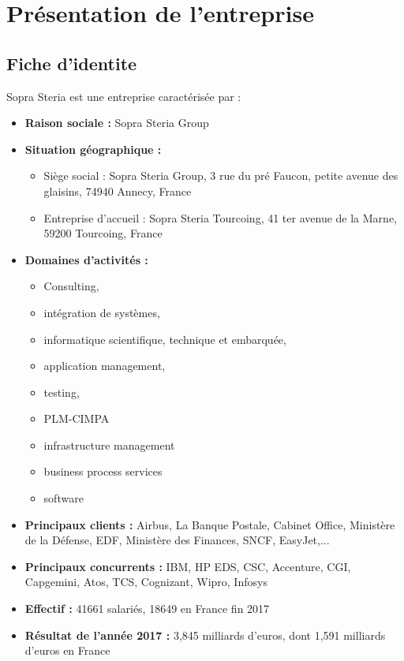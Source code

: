\section{Présentation de l'entreprise}

\subsection{Fiche d'identite}
Sopra Steria est une entreprise caractérisée par :\newline
\begin{itemize}
	\item \textbf{Raison sociale :} Sopra Steria Group
\item  \textbf{Situation géographique :} 
\begin{itemize}
\item Siège social : Sopra Steria Group, 3 rue du pré Faucon, petite avenue des glaisins, 74940 Annecy, France 
\item Entreprise d'accueil : Sopra Steria Tourcoing, 41 ter avenue de la Marne, 59200 Tourcoing, France
\end{itemize}
\item  \textbf{Domaines d'activités :}
\begin{itemize}
	\item Consulting,
	\item intégration de systèmes,
	\item informatique scientifique, technique et embarquée,
	\item application management,
	\item testing,
	\item PLM-CIMPA
	\item infrastructure management
	\item business process services
	\item software
\end{itemize}
\item \textbf{Principaux clients :} Airbus, La Banque Postale, Cabinet Office, Ministère de la Défense,
EDF, Ministère des Finances, SNCF, EasyJet,...
\item \textbf{Principaux concurrents :} IBM, HP EDS, CSC, Accenture, CGI, Capgemini, Atos,
TCS, Cognizant, Wipro, Infosys
\item \textbf{Effectif :} 41661 salariés, 18649 en France fin 2017
\item \textbf{Résultat de l'année 2017 :} 3,845 milliards d'euros, dont 1,591 milliards d'euros en
France

\end{itemize}

